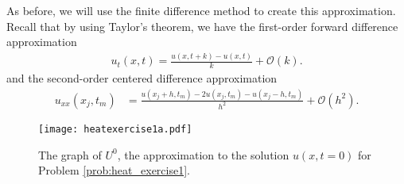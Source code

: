 \begin{comment}
A common method for modeling ordinary and partial differential equations is the finite difference method, so-named because equations containing derivatives are replaced with equations containing difference schemes.
These difference schemes can often be found using Taylor's theorem.
For example, the equation
\begin{align*}
	u(x,t_m + k) = u(x,t_m) + u_t(x,t_m)k + \mathcal{O}(k^2)
\end{align*}
yields a first-order forward difference approximation to $u_t(x,t_m)$, namely,
\begin{align*}
	u_t(x,t_m ) = \frac{u(x,t_m+k) - u(x,t_m)}{k} + \mathcal{O}(k).
\end{align*}
Similarly, by adding the equations
\begin{align*}
	u(x_j+h,t) &= u(x_j,t) + u_x(x_j,t)h + u_{xx}(x_j,t)\frac{h^2}{2} + u_{xxx}(x_j,t)h^3 + \mathcal{O}(h^4),\\
	u(x_j-h,t) &= u(x_j,t) + u_x(x_j,t)(-h) + u_{xx}(x_j,t)\frac{(-h)^2}{2} + u_{xxx}(x_j,t)(-h)^3 + \mathcal{O}(h^4),
\end{align*}
we obtain a second-order centered difference approximation to $u_{xx}(x_j,t)$:
\begin{align*}
	u_{xx}(x_j,t_m) &= \frac{u(x_j + h,t_m )-2 u(x_j,t_m)- u(x_j - h,t_m)}{h^2} + \mathcal{O}(h^2).
\end{align*}
\end{comment}

As before, we will use the finite difference method to create this approximation.
Recall that by using Taylor's theorem, we have the first-order forward difference approximation
\begin{align*}
	u_t(x,t) = \frac{u(x,t+k) - u(x,t)}{k} + \mathcal{O}(k).
\end{align*}
and the second-order centered difference approximation
\begin{align*}
	u_{xx}(x_j,t_m) &= \frac{u(x_j + h,t_m )-2 u(x_j,t_m)- u(x_j - h,t_m)}{h^2} + \mathcal{O}(h^2).
\end{align*}

\begin{figure}
\centering
\texttt{[image: heatexercise1a.pdf]}
\caption{The graph of $U^{0}$, the approximation to the solution $u(x,t=0)$ for Problem \ref{prob:heat_exercise1}.}
\label{fig:heatexercise1a}
\end{figure}


